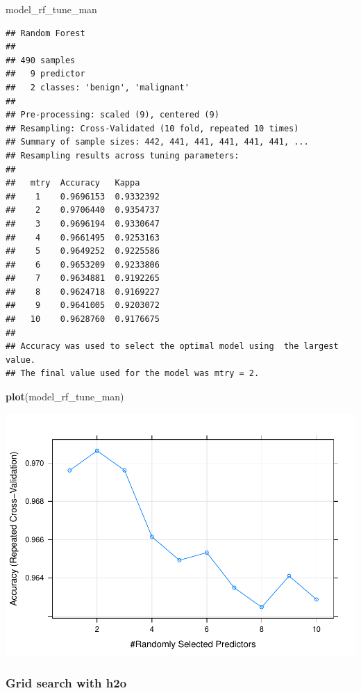 \documentclass[]{article}
\newenvironment{Shaded}{\begin{snugshade}}{\end{snugshade}}
\newcommand{\KeywordTok}[1]{\textcolor[rgb]{0.13,0.29,0.53}{\textbf{{#1}}}}
\newcommand{\NormalTok}[1]{{#1}}
\begin{document}
\begin{Shaded}
\begin{Highlighting}[]
\NormalTok{model_rf_tune_man}
\end{Highlighting}
\end{Shaded}

\begin{verbatim}
## Random Forest 
## 
## 490 samples
##   9 predictor
##   2 classes: 'benign', 'malignant' 
## 
## Pre-processing: scaled (9), centered (9) 
## Resampling: Cross-Validated (10 fold, repeated 10 times) 
## Summary of sample sizes: 442, 441, 441, 441, 441, 441, ... 
## Resampling results across tuning parameters:
## 
##   mtry  Accuracy   Kappa    
##    1    0.9696153  0.9332392
##    2    0.9706440  0.9354737
##    3    0.9696194  0.9330647
##    4    0.9661495  0.9253163
##    5    0.9649252  0.9225586
##    6    0.9653209  0.9233806
##    7    0.9634881  0.9192265
##    8    0.9624718  0.9169227
##    9    0.9641005  0.9203072
##   10    0.9628760  0.9176675
## 
## Accuracy was used to select the optimal model using  the largest value.
## The final value used for the model was mtry = 2.
\end{verbatim}

\begin{Shaded}
\begin{Highlighting}[]
\KeywordTok{plot}\NormalTok{(model_rf_tune_man)}
\end{Highlighting}
\end{Shaded}

\includegraphics{webinar_code_files/figure-latex/unnamed-chunk-41-1.pdf}

\subsubsection{Grid search with h2o}\label{grid-search-with-h2o}
\end{document}
